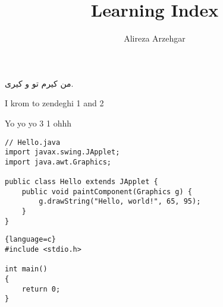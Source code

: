 \documentclass[]{article}
\title{Learning Index}
\author{Alireza Arzehgar}
\begin{document}
\maketitle


من کیرم تو 
\cite{M1}
و 
\cite{M2}
کیری.

\setLTRbibitems
\begin{thebibliography}{99}
\resetlatinfont
{}
I krom to zendeghi 1 and 2

Yo yo yo 3 1 ohhh

\end{thebibliography}

\begin{latin}
\begin{verbatim}
// Hello.java
import javax.swing.JApplet;
import java.awt.Graphics;

public class Hello extends JApplet {
	public void paintComponent(Graphics g) {
		g.drawString("Hello, world!", 65, 95);
	}    
}
\end{verbatim}
\end{latin}



\begin{latin}
\begin{lstlisting}{language=c}
#include <stdio.h>

int main()
{
	return 0;
}
\end{lstlisting}
\end{latin}

\printindex
\end{document}
